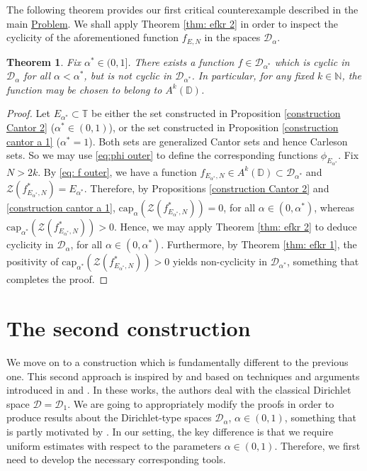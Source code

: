 \documentclass[12pt]{amsart}
\newtheorem{theorem}{Theorem}[section]
\theoremstyle{definition}\newtheorem{remark}[theorem]{Remark}
\theoremstyle{definition}\newtheorem{example}[theorem]{Example}
\theoremstyle{definition}\newtheorem{definition}{Definition}
\numberwithin{equation}{section}
\newcommand\cD{{\mathcal D}}
\newcommand\DD{{\mathbb D}}
\newcommand\TT{{\mathbb T}}
\begin{document}
The following theorem provides our first critical counterexample described in the main \hyperref[Problem]{Problem}. We shall apply Theorem \ref{thm: efkr 2} in order to inspect the cyclicity of the aforementioned function $f_{E,N}$ in the spaces $\cD_\alpha$.


\begin{theorem}\label{first}
Fix $\alpha^*\in (0,1]$. There exists a function $f\in \cD_{\alpha^*}$ which is cyclic in $\cD_\alpha$ for all $\alpha<\alpha^*$, but is not cyclic in $\cD_{\alpha^*}$. In particular, for any fixed $k\in\mathbb{N}$, the function may be chosen to belong to $A^k(\DD)$.
\end{theorem}
\begin{proof}
Let $E_{\alpha^*}\subset \TT$ be either the set constructed in Proposition \ref{construction Cantor 2} ($\alpha^*\in (0,1)$), or the set constructed in Proposition \ref{construction cantor a 1} ($\alpha^*=1$). Both sets are generalized Cantor sets and hence Carleson sets. So we may use \eqref{eq:phi outer} to define the corresponding functions $\phi_{E_{\alpha^*}}$. Fix $N>2k$. By \eqref{eq: f outer}, we have a function $f_{E_{\alpha^*},N}\in A^k(\DD)\subset\cD_{\alpha^*}$ and $\mathcal{Z}(f_{E_{\alpha^*},N}^*)=E_{\alpha^*}$. Therefore, by Propositions \ref{construction Cantor 2} and \ref{construction cantor a 1}, $\mathrm{cap}_\alpha(\mathcal{Z}(f_{E_{\alpha^*},N}^*))=0$, for all $\alpha\in (0,\alpha^*)$, whereas $\mathrm{cap}_{\alpha^*}(\mathcal{Z}(f_{E_{\alpha^*},N}^*))>0$. Hence, we may apply Theorem \ref{thm: efkr 2} to deduce cyclicity in $\cD_\alpha$, for all $\alpha\in(0,\alpha^*)$. Furthermore, by Theorem \ref{thm: efkr 1}, the positivity of $\mathrm{cap}_{\alpha^*}(\mathcal{Z}(f_{E_{\alpha^*},N}^*))>0$ yields non-cyclicity in $\cD_{\alpha^*}$, something that completes the proof.
\end{proof}


\section{The second construction}
We move on to a construction which is fundamentally different to the previous one. This second approach is inspired by and based on techniques and arguments introduced in \cite{Brown-Cohn, Carleson2} and \cite[Section 3.4]{Primer}. In these works, the authors deal with the classical Dirichlet space $\cD=\cD_1$. We are going to appropriately modify the proofs in order to produce results about the Dirichlet-type spaces $\cD_\alpha$, $\alpha\in(0,1)$, something that is partly motivated by \cite[Remark 2]{Brown-Cohn}. In our setting, the key difference is that we require uniform estimates with respect to the parameters $\alpha\in (0,1)$. Therefore, we first need to develop the necessary corresponding tools.
\end{document}
